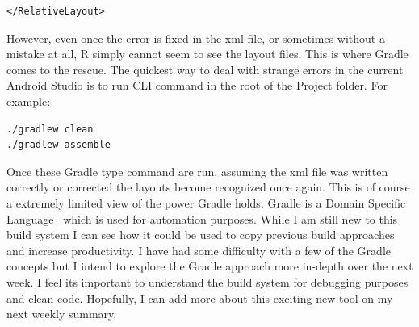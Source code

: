 \documentclass[fontsize=11pt, %
paper=a4, %
twoside, %
captions=tableheading,
index=totoc,
hyperref]{labbook}
\begin{document}
\begin{addmargin}[4cm]{0cm}
\begin{verbatim}
</RelativeLayout>
\end{verbatim}
\begin{onehalfspace}
However, even once the error is fixed in the xml file, or sometimes without a mistake at all, R simply cannot seem to see the layout files. This is where Gradle comes to the rescue. The quickest way to deal with strange errors in the current Android Studio is to run CLI command in the root of the Project folder. For example:    
\end{onehalfspace}
\begin{verbatim}
./gradlew clean
./gradlew assemble
\end{verbatim}
\begin{onehalfspace}
	Once these Gradle type command are run, assuming the xml file was written correctly or corrected the layouts become recognized once again. This is of course a extremely limited view of the power Gradle holds. Gradle is a Domain Specific Language~\citep{gradle} which is used for automation purposes. While I am still new to this build system I can see how it could be used to copy previous build approaches and increase productivity. I have had some difficulty with a few of the Gradle concepts but I intend to explore the Gradle approach more in-depth over the next week. I feel its important to understand the build system for debugging purposes and clean code. Hopefully, I can add more about this exciting new tool on my next weekly summary.
\end{onehalfspace}


\end{addmargin}
\clearpage
\printbibliography
\end{document}
